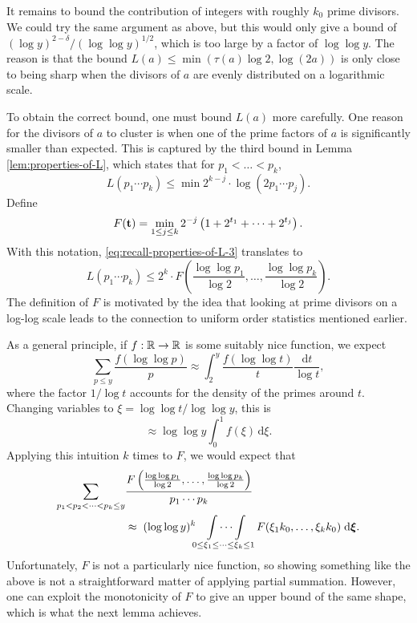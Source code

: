 It remains to bound the contribution of integers with roughly $k_0$ prime divisors. 
We could try the same argument as above, but this would only give a bound of $(\log y)^{2 - \delta} / (\log \log y)^{1/2}$, which is too large by a factor of $\log \log y$.
The reason is that the bound $L(a) \le \min(\tau(a) \log 2, \log(2a))$ is only close to being sharp when the divisors of $a$ are evenly distributed on a logarithmic scale.

To obtain the correct bound, one must bound $L(a)$ more carefully.
One reason for the divisors of $a$ to cluster is when one of the prime factors of $a$ is significantly smaller than expected. 
This is captured by the third bound in Lemma \ref{lem:properties-of-L}, which states that for $p_1 < \dots < p_k$,
\begin{equation} \label{eq:recall-properties-of-L-3}
    L(p_1 \cdots p_k) \le \min 2^{k-j} \cdot \log (2p_1 \cdots p_j).
\end{equation}
Define
\begin{equation*}
    F(\mathbf{t}) = \min \limits_{1 \le j \le k} 2^{-j} \left( 1 + 2^{t_1} + \dots + 2^{t_j} \right).
\end{equation*}
With this notation, \eqref{eq:recall-properties-of-L-3} translates to
\begin{equation*}
    L(p_1 \cdots p_k) \le 2^{k}\cdot F\left( \frac{\log \log p_1}{\log 2}, \dots, \frac{\log \log p_k}{\log 2} \right).
\end{equation*}
The definition of $F$ is motivated by the idea that looking at prime divisors on a log-log scale leads to the connection to uniform order statistics mentioned earlier.

As a general principle, if $f: \mathbb{R} \rightarrow \mathbb{R}$ is some suitably nice function,
we expect 
\begin{equation*}
    \sum \limits_{p \le y} \frac{f(\log \log p)}{p} \approx \int_{2}^y \frac{f(\log \log t)}{t} \frac{\mathrm d t}{\log t},
\end{equation*}
where the factor $1/\log t$ accounts for the density of the primes around $t$.
Changing variables to $\xi = \log \log t / \log \log y$, this is
\begin{equation*}
    \approx \log \log y \int_0^1 f(\xi) \,\mathrm d \xi.
\end{equation*}
Applying this intuition $k$ times to $F$, we would expect that
\begin{align*}
    \sum \limits_{p_1 < p_2 < \dots < p_k \le y} & \frac{F\left( \frac{\log \log p_1}{\log 2}, \dots, \frac{\log \log p_k}{\log 2} \right)}{p_1 \cdots p_k} \\
        & \approx\; (\log \log y)^k  \idotsint \limits_{0 \le \xi_1 \le \dots \le \xi_k\le 1} F(\xi_1 k_0, \dots, \xi_k k_0) \; \mathrm{d} \bm{\xi}.
\end{align*}
Unfortunately, $F$ is not a particularly nice function, so showing something like the above is not a straightforward matter of applying partial summation. 
However, one can exploit the monotonicity of $F$ to give an upper bound of the same shape, which is what the next lemma achieves.

